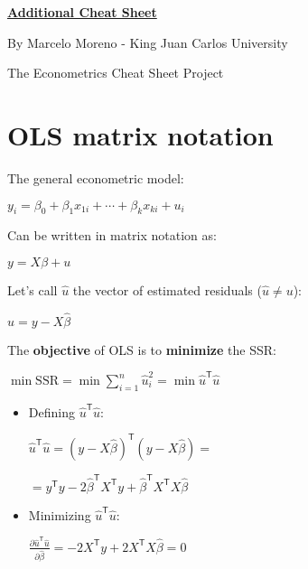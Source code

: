 \documentclass[10pt, a4paper, landscape]{extarticle}
\newcommand{\SSR}{\mathrm{SSR}}
\newcommand{\tr}{\mathsf{T}}
\begin{document}
\setlength{\footskip}{12pt}

\begin{multicols}{3}

\begin{center}
	\textbf{\LARGE \href{https://github.com/marcelomijas/econometrics-cheatsheet}{Additional Cheat Sheet}}
	
	{\footnotesize By Marcelo Moreno - King Juan Carlos University}
	
	{\footnotesize The Econometrics Cheat Sheet Project}
\end{center}

\section*{OLS matrix notation}

The general econometric model:

\begin{center}
	$y_i = \beta_0 + \beta_1 x_{1i} + \cdots + \beta_k x_{ki} + u_i$
\end{center}

Can be written in matrix notation as:

\begin{center}
	$y = X \beta + u$
\end{center}

Let's call $\hat{u}$ the vector of estimated residuals ($\hat{u} \neq u$):

\begin{center}
	$\hat{u} = y - X \hat{\beta}$
\end{center}

The \textbf{objective} of OLS is to \textbf{minimize} the SSR:

\begin{center}
	$\min \SSR = \min \sum_{i=1}^n \hat{u}_i^2 = \min \hat{u}^\tr \hat{u}$
\end{center}

\begin{itemize}[leftmargin=*]
	\item Defining $\hat{u}^\tr \hat{u}$:
	\begin{center}
		$\hat{u}^\tr \hat{u} = (y - X \hat{\beta})^\tr (y - X \hat{\beta}) =$

		$= y^\tr y -2 \hat{\beta}^\tr X^\tr y + \hat{\beta}^\tr X^\tr X \hat{\beta}$
	\end{center}
	\item Minimizing $\hat{u}^\tr \hat{u}$:
	\begin{center}
		$\frac{\partial \hat{u}^\tr \hat{u}}{\partial \hat{\beta}} = -2 X^\tr y + 2 X^\tr X \hat{\beta} = 0$


\end{center}
\end{itemize}
\end{multicols}
\end{document}
